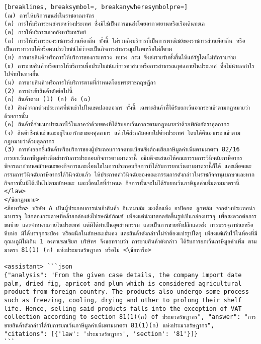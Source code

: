 \begin{Verbatim}[breaklines, breaksymbol=, breakanywheresymbolpre=]
(ณ) การให้บริการขนส่งในราชอาณาจักร
(ด) การให้บริการขนส่งระหว่างประเทศ ซึ่งมิใช่เป็นการขนส่งโดยอากาศยานหรือเรือเดินทะเล
(ต) การให้บริการเช่าอสังหาริมทรัพย์
(ถ) การให้บริการของราชการส่วนท้องถิ่น ทั้งนี้ ไม่รวมถึงบริการที่เป็นการพาณิชย์ของราชการส่วนท้องถิ่น หรือเป็นการหารายได้หรือผลประโยชน์ไม่ว่าจะเป็นกิจการสาธารณูปโภคหรือไม่ก็ตาม
(ท) การขายสินค้าหรือการให้บริการของกระทรวง ทบวง กรม ซึ่งส่งรายรับทั้งสิ้นให้แก่รัฐโดยไม่หักรายจ่าย
(ธ) การขายสินค้าหรือการให้บริการเพื่อประโยชน์แก่การศาสนาหรือการสาธารณกุศลภายในประเทศ ซึ่งไม่นำผลกำไรไปจ่ายในทางอื่น
(น) การขายสินค้าหรือการให้บริการตามที่กำหนดโดยพระราชกฤษฎีกา
(2) การนำเข้าสินค้าดังต่อไปนี้
(ก) สินค้าตาม (1) (ก) ถึง (ฉ)
(ข) สินค้าจากต่างประเทศที่นำเข้าไปในเขตปลอดอากร ทั้งนี้ เฉพาะสินค้าที่ได้รับยกเว้นอากรขาเข้าตามกฎหมายว่าด้วยการนั้น
(ค) สินค้าที่จำแนกประเภทไว้ในภาคว่าด้วยของที่ได้รับยกเว้นอากรตามกฎหมายว่าด้วยพิกัดอัตราศุลกากร
(ง) สินค้าซึ่งนำเข้าและอยู่ในอารักขาของศุลกากร แล้วได้ส่งกลับออกไปต่างประเทศ โดยได้คืนอากรขาเข้าตามกฎหมายว่าด้วยศุลกากร
(3) การส่งออกซึ่งสินค้าหรือบริการของผู้ประกอบการจดทะเบียนซึ่งต้องเสียภาษีมูลค่าเพิ่มตามมาตรา 82/16
การยกเว้นภาษีมูลค่าเพิ่มสำหรับการประกอบกิจการตามมาตรานี้ อธิบดีจะเสนอให้คณะกรรมการวินิจฉัยภาษีอากรพิจารณากำหนดลักษณะของกิจการและเงื่อนไขในการประกอบกิจการที่ได้รับการยกเว้นตามมาตรานี้ก็ได้ และเมื่อคณะกรรมการวินิจฉัยภาษีอากรได้วินิจฉัยแล้ว ให้ประกาศคำวินิจฉัยของคณะกรรมการดังกล่าวในราชกิจจานุเบกษาและหากกิจการนั้นมิได้เป็นไปตามลักษณะ และเงื่อนไขที่กำหนด กิจการนั้นจะไม่ได้รับยกเว้นภาษีมูลค่าเพิ่มตามมาตรานี้ </law>
</ข้อกฎหมาย>
<ข้อหารือ> บริษัท A เป็นผู้ประกอบการนำเข้าสินค้า อินทผาลัม มะเดื่อแห้ง อาปิคอต ลูกพลัม จากต่างประเทศนำมาบรรจุ ใส่กล่องกระดาษที่คล้ายกล่องส่งไปรษณีย์ภัณฑ์ เพียงแต่นำมาสอดขัดขึ้นรูปเป็นกล่องบรรจุ เพื่อสะดวกต่อการขนย้าย และจำหน่ายภายในประเทศ แต่มิได้ทำเป็นอุตสาหกรรม และเป็นการขายทั้งปลีกและส่ง การบรรจุภาชนะหรือหีบห่อ มิได้บรรจุกระป๋อง หรือผนึกในลักษณะมั่นคง และสินค้าดังกล่าวไม่จำต้องแปรรูปใดๆ เพียงแต่เก็บไว้ในห้องที่มีอุณหภูมิไม่เกิน 1 องศาเซลเซียส บริษัทฯ จึงขอทราบว่า การขายสินค้าดังกล่าว ได้รับการยกเว้นภาษีมูลค่าเพิ่ม ตามมาตรา 81(1) (ก) แห่งประมวลรัษฎากร หรือไม่ <\ข้อหารือ>

<assistant> ```json
{"analysis": "From the given case details, the company import date palm, dried fig, apricot and plum which is considered agricultural product from foreign country. The products also undergo some process such as freezing, cooling, drying and other to prolong their shelf life. Hence, selling said products falls into the exception of VAT collection according to section 81(1)(ก) of ประมวลรัษฎากร", "answer": "การขายสินค้าดังกล่าวได้รับการยกเว้นภาษีมูลค่าเพิ่มตามมาตรา 81(1)(ก) แห่งประมวลรัษฎากร", "citations": [{'law': 'ประมวลรัษฎากร', 'section': '81'}]}
```

\end{Verbatim}

